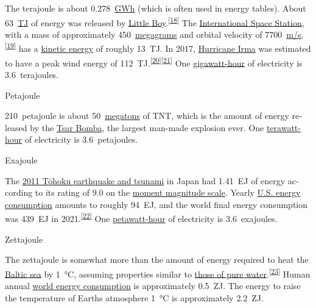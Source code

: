 \documentclass[
]{article}
\newenvironment{LTR}{\beginL}{\endL}
\begin{document}
\begin{LTR}
\begin{otherlanguage}{english}
The terajoule is about {{}0.278~\href{/wiki/Kilowatt-hour}{GWh}} (which
is often used in energy tables). About {{}63~\href{/wiki/Terajoule}{TJ}}
of energy was released by \href{/wiki/Little_Boy}{Little
Boy}.\textsuperscript{\hyperref[cite_note-hironaga-19]{{[}18{]}}} The
\href{/wiki/International_Space_Station}{International Space Station},
with a mass of approximately {{}450~\href{/wiki/Megagrams}{megagrams}}
and orbital velocity of
{{}7700~\href{/wiki/Metre_per_second}{m/s}},\textsuperscript{\hyperref[cite_note-iss-20]{{[}19{]}}}
has a \href{/wiki/Kinetic_energy}{kinetic energy} of roughly {{}13~TJ}.
In 2017, \href{/wiki/Hurricane_Irma}{Hurricane Irma} was estimated to
have a peak wind energy of
{{}112~TJ}.\textsuperscript{\hyperref[cite_note-21]{{[}20{]}}\hyperref[cite_note-22]{{[}21{]}}}
One \href{/wiki/Gigawatt-hour}{gigawatt-hour} of electricity is
{{}3.6~terajoules}.

{\label{Petajoule}{}{Petajoule}}

{{}210~petajoule} is about {{}50~\href{/wiki/Megatons}{megatons}} of
TNT, which is the amount of energy released by the
\href{/wiki/Tsar_Bomba}{Tsar Bomba}, the largest man-made explosion
ever. One \href{/wiki/Terawatt-hour}{terawatt-hour} of electricity is
{{}3.6~petajoules}.

{\label{Exajoule}{}{Exajoule}}

The \href{/wiki/2011_T\%C5\%8Dhoku_earthquake_and_tsunami}{2011 Tōhoku
earthquake and tsunami} in Japan had {{}1.41~EJ} of energy according to
its rating of 9.0 on the \href{/wiki/Moment_magnitude_scale}{moment
magnitude scale}. Yearly \href{/wiki/Energy_in_the_United_States}{U.S.
energy consumption} amounts to roughly {{}94~EJ}, and the world final
energy consumption was {{}439~EJ} in
2021.\textsuperscript{\hyperref[cite_note-23]{{[}22{]}}} One
\href{/wiki/Petawatt-hour}{petawatt-hour} of electricity is
{{}3.6~exajoules}.

{\label{Zettajoule}{}{Zettajoule}}

The zettajoule is somewhat more than the amount of energy required to
heat the \href{/wiki/Baltic_sea}{Baltic sea} by 1~°C, assuming
properties similar to \href{/wiki/Properties_of_water}{those of pure
water}.\textsuperscript{\hyperref[cite_note-Volumes_of_the_Worldux27s_Oceans-24]{{[}23{]}}}
Human annual \href{/wiki/World_energy_consumption}{world energy
consumption} is approximately {{}0.5~ZJ}. The energy to raise the
temperature of Earth\textquotesingle s atmosphere 1~°C is approximately
{{}2.2~ZJ}.


\end{otherlanguage}
\end{LTR}
\end{document}
